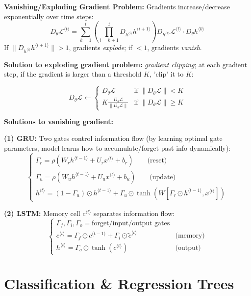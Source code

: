 \documentclass[a4paper,10pt]{article}
\begin{document}
\begin{small}
\textbf{Vanishing/Exploding Gradient Problem:} Gradients increase/decrease exponentially over time steps:
$$
D_{\theta} \mathcal{L}^{\langle t \rangle} = \sum_{k=1}^{t} \left( \prod_{i=k+1}^{t} D_{h^{\langle i \rangle}} h^{\langle i+1 \rangle} \right) D_{h^{\langle k \rangle}} \mathcal{L}^{\langle t \rangle} \cdot D_{\theta} h^{\langle k \rangle}
$$
If $ \| D_{h^{\langle i \rangle}} h^{\langle i+1 \rangle} \| > 1 $, gradients \textit{explode}; if $ < 1 $, gradients \textit{vanish}.

\textbf{Solution to exploding gradient problem:} \textit{gradient clipping}; at each gradient step, if the gradient is larger than a threshold $K$, 'clip' it to $K$:

$$
D_\theta \mathcal{L} \leftarrow 
\begin{cases} 
D_\theta \mathcal{L} & \text{if } \|D_\theta \mathcal{L}\| < K \\ 
K \frac{D_\theta \mathcal{L}}{\|D_\theta \mathcal{L}\|} & \text{if } \|D_\theta \mathcal{L}\| \geq K 
\end{cases}
$$

\textbf{Solutions to vanishing gradient:}

\textbf{(1) GRU:} Two gates control information flow (by learning optimal gate parameters, model learns how to accumulate/forget past info dynamically):
$$\begin{cases}
\Gamma_r = \rho(W_r h^{\langle t-1 \rangle} + U_r x^{\langle t \rangle} + b_r)  \quad \quad \text{(reset)} \\
\Gamma_u = \rho(W_u h^{\langle t-1 \rangle} + U_u x^{\langle t \rangle} + b_u) \quad \quad \text{(update)} \\
h^{\langle t \rangle} = (1-\Gamma_u) \odot h^{\langle t-1 \rangle} + \Gamma_u \odot \tanh(W[\Gamma_r \odot h^{\langle t-1 \rangle}, x^{\langle t \rangle}])
\end{cases}$$

\textbf{(2) LSTM:} Memory cell $c^{\langle t \rangle}$ separates information flow:
$$\begin{cases}
\Gamma_f, \Gamma_i, \Gamma_o = \text{forget/input/output gates} \\
c^{\langle t \rangle} = \Gamma_f \odot c^{\langle t-1 \rangle} + \Gamma_i \odot \tilde{c}^{\langle t \rangle} & \text{(memory)} \\
h^{\langle t \rangle} = \Gamma_o \odot \tanh(c^{\langle t \rangle}) & \text{(output)}
\end{cases}$$


\section{Classification \& Regression Trees}


\end{small}
\end{document}
